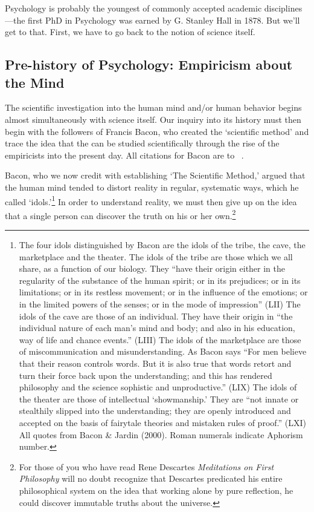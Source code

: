 \begin{refsection}
Psychology is probably the youngest of commonly accepted academic disciplines---the first PhD in Psychology was earned by G. Stanley Hall in 1878. But we'll get to that. First, we have to go back to the notion of science itself.

\subsection{Pre-history of Psychology: Empiricism about the Mind}
\label{pre-historyofpsychology:empiricismaboutthemind}

The scientific investigation into the human mind and\slash or human behavior begins almost simultaneously with science itself. Our inquiry into its history must then begin with the followers of Francis Bacon, who created the ‘scientific method’ and trace the idea that the can be studied scientifically through the rise of the empiricists into the present day. All citations for Bacon are to ~\citep{Bacon:1620ui}.

Bacon, who we now credit with establishing `The Scientific Method,' argued that the human mind tended to distort reality in regular, systematic ways, which he called `idols.'\footnote{The four idols distinguished by Bacon are the idols of the tribe, the cave, the marketplace and the theater. The idols of the tribe are those which we all share, as a function of our biology. They “have their origin either in the regularity of the substance of the human spirit; or in its prejudices; or in its limitations; or in its restless movement; or in the influence of the emotions; or in the limited powers of the senses; or in the mode of impression” (LII)
The idols of the cave are those of an individual. They have their origin in “the individual nature of each man's mind and body; and also in his education, way of life and chance events.” (LIII)
The idols of the marketplace are those of miscommunication and misunderstanding. As Bacon says “For men believe that their reason controls words. But it is also true that words retort and turn their force back upon the understanding; and this has rendered philosophy and the science sophistic and unproductive.” (LIX)
The idols of the theater are those of intellectual `showmanship.' They are “not innate or stealthily slipped into the understanding; they are openly introduced and accepted on the basis of fairytale theories and mistaken rules of proof.” (LXI)
All quotes from Bacon \& Jardin (2000). Roman numerals indicate Aphorism number.} In order to understand reality, we must then give up on the idea that a single person can discover the truth on his or her own.\footnote{For those of you who have read Rene Descartes \emph{Meditations on First Philosophy} will no doubt recognize that Descartes predicated his entire philosophical system on the idea that working alone by pure reflection, he could discover immutable truths about the universe.}


\end{refsection}
